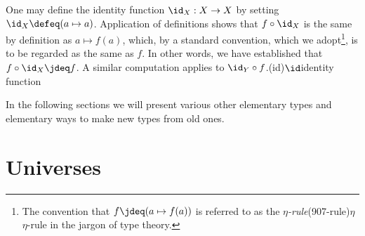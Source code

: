 One may define the identity function $\id_X : X \to X$ by setting $\id_X \defeq (a \mapsto a)$.  Application of definitions shows that
$f \circ \id_X$ is the same by definition as $a \mapsto f(a)$, which, by a standard convention, which we adopt\footnote{The convention that
  $f \jdeq (a \mapsto f(a))$ is referred to as the \emph{$\eta$-rule}\glossary(907-rule){$\eta$}{$\eta$-rule} in the jargon of type theory.}, is to be regarded as the same as $f$.  In
other words, we have established that $f \circ \id_X \jdeq f$.%
\label{page:idofetaf}
A similar computation applies to $\id_Y \circ f$.\glossary(id){$\id$}{identity function}

In the following sections we will present various other elementary types and elementary ways to make new types from old ones.

\section{Universes}
\label{sec:universes}


